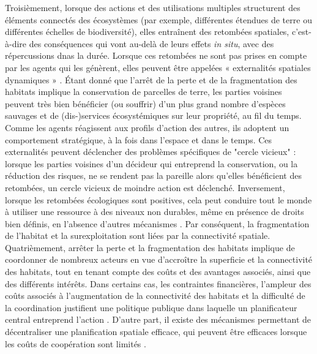 Troisièmement, lorsque des actions et des utilisations multiples structurent des éléments connectés des écosystèmes (par exemple, différentes étendues de terre ou différentes échelles de biodiversité), elles entraînent des retombées spatiales, c'est-à-dire des conséquences qui vont au-delà de leurs effets \textit{in situ}, avec des répercussions dnas la durée. Lorsque ces retombées ne sont pas prises en compte par les agents qui les génèrent, elles peuvent être appelées « externalités spatiales dynamiques » \citep{sanchirico_bioeconomics_1999, costello_optimal_2008, costello_private_2017}. Étant donné que l'arrêt de la perte et de la fragmentation des habitats implique la conservation de parcelles de terre, les parties voisines peuvent très bien bénéficier (ou souffrir) d'un plus grand nombre d'espèces sauvages et de (dis-)services écosystémiques sur leur propriété, au fil du temps. Comme les agents réagissent aux profils d'action des autres, ils adoptent un comportement stratégique, à la fois dans l'espace et dans le temps. Ces externalités peuvent déclencher des problèmes spécifiques de "cercle vicieux" \citep{costello_private_2017} : lorsque les parties voisines d'un décideur qui entreprend la conservation, ou la réduction des risques, ne se rendent pas la pareille alors qu'elles bénéficient des retombées, un cercle vicieux de moindre action est déclenché. Inversement, lorsque les retombées écologiques sont positives, cela peut conduire tout le monde à utiliser une ressource à des niveaux non durables, même en présence de droits bien définis, en l'absence d'autres mécanismes \citep{janmaat_sharing_2005,kaffine_unitization_2010}.  Par conséquent, la fragmentation de l'habitat et la surexploitation sont liées par la connectivité spatiale. 
\\
Quatrièmement, arrêter la perte et la fragmentation des habitats implique de coordonner de nombreux acteurs en vue d'accroître la superficie et la connectivité des habitats, tout en tenant compte des coûts et des avantages associés, ainsi que des différents intérêts.
Dans certains cas, les contraintes financières, l'ampleur des coûts associés à l'augmentation de la connectivité des habitats et la difficulté de la coordination justifient une politique publique dans laquelle un planificateur central entreprend l'action \citep{Mouysset2012}. D'autre part, il existe des mécanismes permettant de décentraliser une planification spatiale efficace, qui peuvent être efficaces lorsque les coûts de coopération sont limités \citep{costello_private_2017, bareille_agglomeration_2023}. 

